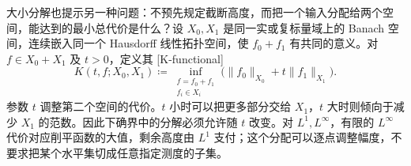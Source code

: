 \ProseParagraphBreak

大小分解也提示另一种问题：不预先规定截断高度，而把一个输入分配给两个空间，能达到的最小总代价是什么？设 \(X_0,X_1\) 是同一实或复标量域上的 Banach 空间，连续嵌入同一个 Hausdorff 线性拓扑空间，使 \(f_0+f_1\) 有共同的意义。对 \(f\in X_0+X_1\) 及 \(t>0\)，定义其 [K-functional]
\[
 K(t,f;X_0,X_1)\coloneqq
 \inf_{\substack{f=f_0+f_1\\f_i\in X_i}}
 \bigl(\|f_0\|_{X_0}+t\|f_1\|_{X_1}\bigr).
\]
参数 \(t\) 调整第二个空间的代价。\(t\) 小时可以把更多部分交给 \(X_1\)，\(t\) 大时则倾向于减少 \(X_1\) 的范数。因此下确界中的分解必须允许随 \(t\) 改变。对 \(L^1,L^\infty\)，有限的 \(L^\infty\) 代价对应削平函数的大值，剩余高度由 \(L^1\) 支付；这个分配可以逐点调整幅度，不要求把某个水平集切成任意指定测度的子集。

